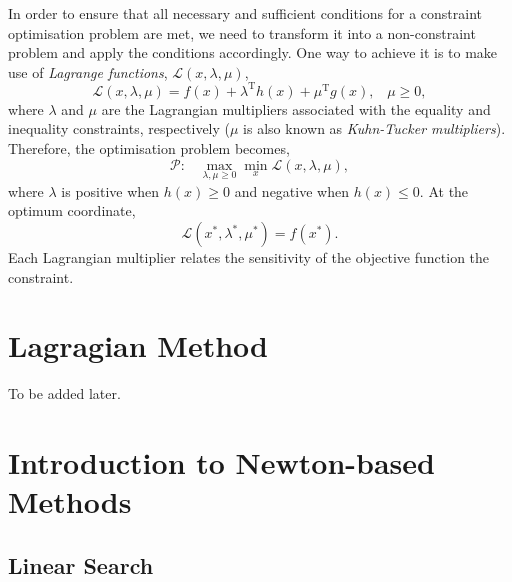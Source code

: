 In order to ensure that all necessary and sufficient conditions for a constraint optimisation problem are met, we need to transform it into a non-constraint problem and apply the conditions accordingly. One way to achieve it is to make use of {\it Lagrange functions}, $\mathcal{L}\left(x,\lambda,\mu\right)$,
    \begin{displaymath}   
       \mathcal{L}\left(x,\lambda,\mu\right) = f(x) + \lambda^{\text{T}}h(x) + \mu^{\text{T}}g(x),\;\;\;\mu\ge 0,
    \end{displaymath}
where $\lambda$ and $\mu$ are the Lagrangian multipliers associated with the equality and inequality constraints, respectively ($\mu$ is also known as {\it Kuhn-Tucker multipliers}). Therefore, the optimisation problem becomes,
    \begin{displaymath}
       \mathcal{P}:\;\;\;\max_{\lambda,\mu\ge 0} \min_{x} \mathcal{L}\left(x,\lambda,\mu\right),
    \end{displaymath} 
where $\lambda$ is positive when $h(x)\ge 0$ and negative when $h(x)\le 0$. At the optimum coordinate,
    \begin{displaymath}
       \mathcal{L}\left(x^{\ast}, \lambda^{\ast},\mu^{\ast}\right) = f\left(x^{\ast}\right).
    \end{displaymath}
Each Lagrangian multiplier relates the sensitivity of the objective function \wrt the constraint.


\section{Lagragian Method}
To be added later.





\section{Introduction to Newton-based Methods}\label{Chapter:GlobalOpt:Section:NewtonMethods}

\subsection{Linear Search}\label{Chapter:GlobalOpt:Section:NewtonMethods:LinearSearch}

